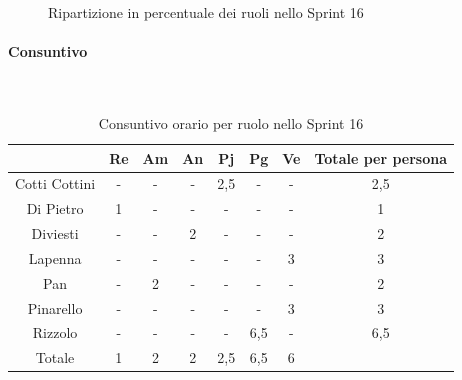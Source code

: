 \documentclass{article}
\begin{document}
            \begin{figure}[H]
                \centering
                \caption{Ripartizione in percentuale dei ruoli nello Sprint 16}
            \end{figure}


            \paragraph{Consuntivo}\mbox{}\\
            \begin{table}[H]
                \centering
                \begin{tabular}{|c|c|c|c|c|c|c|c|}
                \hline
                              & Re  & Am  & An  & Pj  & Pg  & Ve  & Totale per persona \\ \hline
                Cotti Cottini & -   & -   & -   & 2,5 & -   & -   & 2,5                \\ \hline
                Di Pietro     & 1   & -   & -   & -   & -   & -   & 1                  \\ \hline
                Diviesti      & -   & -   & 2   & -   & -   & -   & 2                  \\ \hline
                Lapenna       & -   & -   & -   & -   & -   & 3   & 3                  \\ \hline
                Pan           & -   & 2   & -   & -   & -   & -   & 2                  \\ \hline
                Pinarello     & -   & -   & -   & -   & -   & 3   & 3                  \\ \hline
                Rizzolo       & -   & -   & -   & -   & 6,5 & -   & 6,5                \\ \hline
                Totale        & 1   & 2   & 2   & 2,5 & 6,5 & 6   &                    \\ \hline
                \end{tabular}
                \caption{Consuntivo orario per ruolo nello Sprint 16}
            \end{table}

\end{document}
